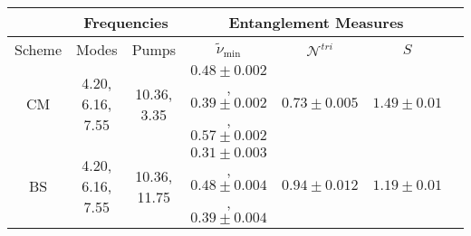 \documentclass[prl,10pt,twocolumn,superscriptaddress,notitlepage,floatfix,amssymb]{revtex4}
\begin{document}
\begin{table*}
\begin{tabular}{|c||c|c||c|c|c|c|}
\hline
  &\multicolumn{2}{|c||}{Frequencies} & \multicolumn{3}{|c|}{Entanglement Measures} \\
\hline
Scheme & Modes &  Pumps & $\tilde{\nu}_{\text{min}}$ & $\mathcal{N}^{tri}$ & $S$\\
\hline
\hline
CM & 4.20, 6.16, 7.55 & 10.36, 3.35 & $0.48\pm0.002$, $0.39\pm0.002$, $0.57\pm0.002$ & $0.73\pm0.005$ & $1.49\pm0.01$\\
\hline
BS & 4.20, 6.16, 7.55 & 10.36, 11.75 & $0.31\pm0.003$, $0.48\pm0.004$, $0.39\pm0.004$ & $0.94\pm0.012$ & $1.19\pm0.01$\\
\hline
\end{tabular}

\end{table*}
\end{document}
